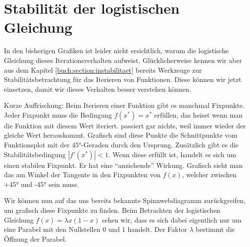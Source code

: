 %
%
%
\section{Stabilität der logistischen Gleichung
\label{logistic:section:stabil}}

In den bisherigen Grafiken ist leider nicht ersichtlich, 
warum die logistische Gleichung dieses Iterationsverhalten aufweist. 
Glücklicherweise kennen wir aber aus dem Kapitel 
\ref{buch:section:instabilitaet}
bereits Werkzeuge zur Stabilitätsbetrachtung für
das Iterieren von Funktionen. 
%
Diese können wir jetzt einsetzen, damit wir dieses
Verhalten besser verstehen können. 

Kurze Auffrischung: Beim Iterieren einer Funktion
gibt es manchmal Fixpunkte. 
%
Jeder Fixpunkt muss die Bedingung
$f(x^*)=x^*$ erfüllen, das heisst wenn man die Funktion
mit diesem Wert iteriert. passiert gar nichts, weil
immer wieder der gleiche Wert herauskommt. 
Grafisch sind diese Punkte die Schnittpunkte
vom Funktionsplot mit der 45°-Geraden durch den Ursprung.  
Zusätzlich gibt es die Stabilitätsbedingung 
$|f'(x^*)| < 1$. 
Wenn diese erfüllt ist, handelt es sich um einen
stabilen Fixpunkt. 
Er hat eine ``anziehende'' Wirkung. 
Grafisch sieht man das am Winkel der Tangente in den
Fixpunkten von $f(x)$, welcher zwischen +45° und -45° sein muss.

Wir können nun auf das uns bereits bekannte Spinnwebdiagramm
zurückgreifen, um grafisch diese Fixpunkte zu finden.
%
Beim Betrachten der logistischen Gleichung 
$f(x) = \lambda x (1-x)$ sehen wir, 
dass es sich dabei eigentlich nur um eine Parabel mit 
den Nullstellen $0$ und $1$ handelt. 
Der Faktor $\lambda$ bestimmt die Öffnung der Parabel.  

